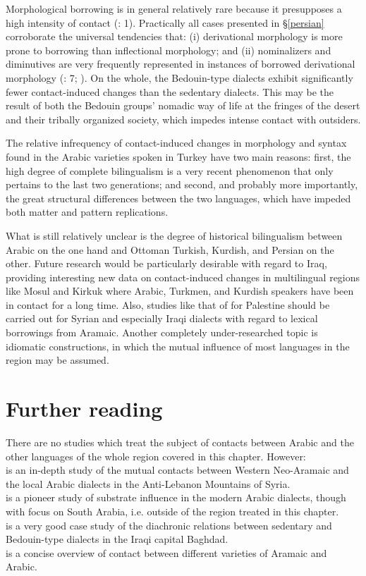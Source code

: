 \documentclass[output=paper]{langsci/langscibook}
\begin{document}
Morphological borrowing is in general relatively rare because it presupposes a high intensity of contact (\citealt{GardaniArkadievAmiridze2015}: 1). Practically all cases presented in §\ref{persian} corroborate the universal tendencies that: (i) derivational morphology is more prone to borrowing than inflectional morphology; and (ii) nominalizers and diminutives are very frequently represented in instances of borrowed derivational morphology (\citealt{GardaniArkadievAmiridze2015}: 7; \citealt{Seifart2013}). On the whole, the Bedouin-type dialects exhibit significantly fewer contact-induced changes than the sedentary dialects. This may be the result of both the Bedouin groups' nomadic way of life at the fringes of the desert and their tribally organized society, which impedes intense contact with outsiders.

The relative infrequency of contact-induced changes in morphology and syntax found in the Arabic varieties spoken in Turkey have two main reasons: first, the high degree of complete bilingualism is a very recent phenomenon that only pertains to the last two generations; and second, and probably more importantly, the great structural differences between the two languages, which have impeded both matter and pattern replications.

What is still relatively unclear is the degree of historical bilingualism between Arabic on the one hand and Ottoman Turkish, Kurdish, and Persian on the other. Future research would be particularly desirable with regard to Iraq, providing interesting new data on contact-induced changes in multilingual regions like Mosul and Kirkuk where Arabic, Turkmen, and Kurdish speakers have been in contact for a long time. Also, studies like that of  \citet{Neishtadt2015} for Palestine should be carried out for Syrian and especially Iraqi dialects with regard to lexical borrowings from Aramaic. Another completely under-researched topic is idiomatic constructions, in which the mutual influence of most languages in the region may be assumed.

\section*{Further reading}

There are no studies which treat the subject of contacts between Arabic and the other languages of the whole region covered in this chapter. However:\\
\citet{ArnoldBehnstedt1993} is an in-depth study of the mutual contacts between Western Neo-Aramaic and the local Arabic dialects in the Anti-Lebanon Mountains of Syria.\\
\citet{Diem1979} is a pioneer study of substrate influence in the modern Arabic dialects, though with focus on South Arabia, i.e. outside of the region treated in this chapter.\\
\citet{Palva2009} is a very good case study of the diachronic relations between sedentary and Bedouin-type dialects in the Iraqi capital Baghdad.\\
\citet{Weninger2011Aramaic} is a concise overview of contact between different varieties of Aramaic and Arabic.
\end{document}
